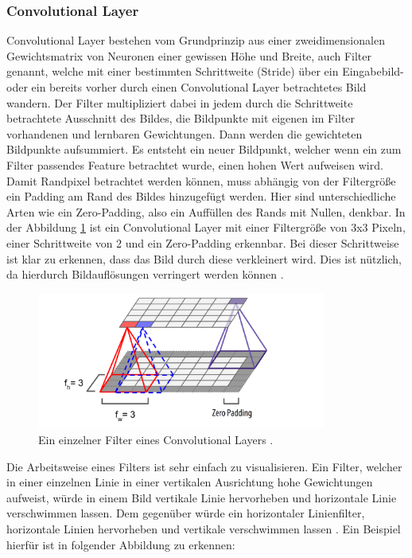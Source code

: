 \documentclass[11pt,bibliography=totocnumbered]{scrartcl}
\begin{document}
\subsubsection{Convolutional Layer}
Convolutional Layer bestehen vom Grundprinzip aus einer zweidimensionalen Gewichtsmatrix von Neuronen einer gewissen Höhe und Breite, auch Filter genannt, welche mit einer bestimmten Schrittweite (Stride) über ein Eingabebild- oder ein bereits vorher durch einen Convolutional Layer betrachtetes Bild wandern. Der Filter multipliziert dabei in jedem durch die Schrittweite betrachtete Ausschnitt des Bildes, die Bildpunkte mit eigenen im Filter vorhandenen und lernbaren Gewichtungen. Dann werden die gewichteten Bildpunkte aufsummiert. Es entsteht ein neuer Bildpunkt, welcher wenn ein zum Filter passendes Feature betrachtet wurde, einen hohen Wert aufweisen wird. Damit Randpixel betrachtet werden können, muss abhängig von der Filtergröße ein Padding am Rand des Bildes hinzugefügt werden. Hier sind unterschiedliche Arten wie ein Zero-Padding, also ein Auffüllen des Rands mit Nullen, denkbar. In der Abbildung \ref{fig:cnn_filter} ist ein Convolutional Layer mit einer Filtergröße von 3x3 Pixeln, einer Schrittweite von 2 und ein Zero-Padding erkennbar. Bei dieser Schrittweise ist klar zu erkennen, dass das Bild durch diese verkleinert wird. Dies ist nützlich, da hierdurch Bildauflösungen verringert werden können \cite[S.361-363]{MACHINE_LEARNING}.
\begin{figure}[H]
	\centering
	\includegraphics[width=0.85\textwidth]{cnn}
	\vspace*{-3mm}
	\caption[Einzelner Filter eines Convolutional Layers]{Ein einzelner Filter eines Convolutional Layers \cite[S.362]{MACHINE_LEARNING}.}
	\label{fig:cnn_filter}
\end{figure}
\vspace*{-5mm}
Die Arbeitsweise eines Filters ist sehr einfach zu visualisieren. Ein Filter, welcher in einer einzelnen Linie in einer vertikalen Ausrichtung hohe Gewichtungen aufweist, würde in einem Bild vertikale Linie hervorheben und horizontale Linie verschwimmen lassen. Dem gegenüber würde ein horizontaler Linienfilter, horizontale Linien hervorheben und vertikale verschwimmen lassen \cite[S.363-364]{MACHINE_LEARNING}. Ein Beispiel hierfür ist in folgender Abbildung zu erkennen:
\end{document}

